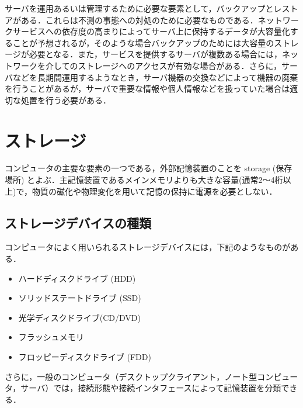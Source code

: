 サーバを運用あるいは管理するために必要な要素として，バックアップとレスト
アがある．これらは不測の事態への対処のために必要なものである．ネットワー
クサービスへの依存度の高まりによってサーバ上に保持するデータが大容量化す
ることが予想されるが，そのような場合バックアップのためには大容量のストレ
ージが必要となる．また，サービスを提供するサーバが複数ある場合には，ネッ
トワークを介してのストレージへのアクセスが有効な場合がある．さらに，サー
バなどを長期間運用するようなとき，サーバ機器の交換などによって機器の廃棄
を行うことがあるが，サーバで重要な情報や個人情報などを扱っていた場合は適
切な処置を行う必要がある．

\section{ストレージ}

コンピュータの主要な要素の一つである，外部記憶装置のことを storage (保存
場所) とよぶ．主記憶装置であるメインメモリよりも大きな容量(通常2〜4桁以
上)で，物質の磁化や物理変化を用いて記憶の保持に電源を必要としない．

\subsection{ストレージデバイスの種類}
コンピュータによく用いられるストレージデバイスには，下記のようなものがあ
る．

\begin{itemize}
 \item ハードディスクドライブ (HDD)
 \item ソリッドステートドライブ (SSD)
 \item 光学ディスクドライブ(CD/DVD)
 \item フラッシュメモリ
 \item フロッピーディスクドライブ (FDD)
\end{itemize}


さらに，一般のコンピュータ（デスクトップクライアント，ノート型コンピュー
タ，サーバ）では，接続形態や接続インタフェースによって記憶装置を分類できる．

%
%
%

